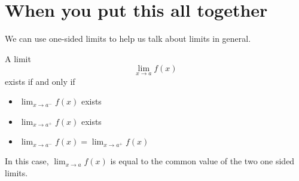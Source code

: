 \documentclass{ximera}
\begin{document}
\section{When you put this all together}

We can use one-sided limits to help us talk about limits in general.
\begin{theorem}
  A limit
  \[
  \lim_{x \to a} f(x)
  \]
  exists if and only if
  \begin{itemize}
  \item $\lim_{x \to a^-} f(x)$ exists
  \item $\lim_{x \to a^+} f(x)$ exists
  \item $\lim_{x \to a^-} f(x) = \lim_{x \to a^+} f(x)$
  \end{itemize}
  In this case, $\lim_{x \to a} f(x)$ is equal to the common
  value of the two one sided limits.
\end{theorem}
\end{document}
